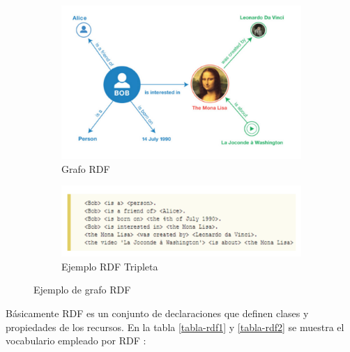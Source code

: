 \begin{figure}[H]
	\centering
	\begin{subfigure}[h]{0.75\textwidth} 
		\includegraphics[width=\textwidth]{imagenes/capitulo3/grafoRDF}
		\caption{Grafo RDF}
	\end{subfigure}       
	\begin{subfigure}[h]{0.79\textwidth} 
		\includegraphics[width=\textwidth]{imagenes/capitulo3/ejemploRDF}
		\caption{Ejemplo RDF Tripleta}
	\end{subfigure}
	\caption{Ejemplo de grafo RDF \cite{aplicacion}}
	\label{fig:ejemploRDF}
\end{figure}

Básicamente RDF es un conjunto de declaraciones que definen clases y propiedades de los recursos. En la tabla \ref{tabla-rdf1} y \ref{tabla-rdf2} se muestra el vocabulario empleado por RDF \cite{tesis-otro}:


